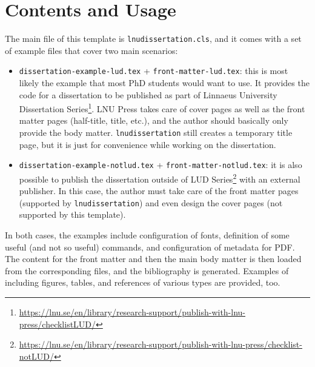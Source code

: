 \documentclass[10pt,a4paper]{article}
\begin{document}
\section{Contents and Usage}
The main file of this template is \texttt{lnudissertation.cls}, and it comes with a set of example files that cover two main scenarios:
\begin{itemize}
\item \texttt{dissertation-example-lud.tex} + \texttt{front-matter-lud.tex}: this is most likely the example that most PhD students would want to use. 
It provides the code for a dissertation to be published as part of Linnaeus University Dissertation Series\footnote{\url{https://lnu.se/en/library/research-support/publish-with-lnu-press/checklistLUD/}}. 
LNU Press takes care of cover pages as well as the front matter pages (half-title, title, etc.), and the author should basically only provide the body matter. 
\texttt{lnudissertation} still creates a temporary title page, but it is just for convenience while working on the dissertation. 
\item \texttt{dissertation-example-notlud.tex} + \texttt{front-matter-notlud.tex}: it is also possible to publish the dissertation outside of LUD Series\footnote{\url{https://lnu.se/en/library/research-support/publish-with-lnu-press/checklist-notLUD/}} with an external publisher. 
In this case, the author must take care of the front matter pages (supported by \texttt{lnudissertation}) and even design the cover pages (not supported by this template).
\end{itemize}

\noindent In both cases, the examples include configuration of fonts, definition of some useful (and not so useful) commands, and configuration of metadata for PDF. 
The content for the front matter and then the main body matter is then loaded from the corresponding files, and the bibliography is generated. 
Examples of including figures, tables, and references of various types are provided, too.
\end{document}

